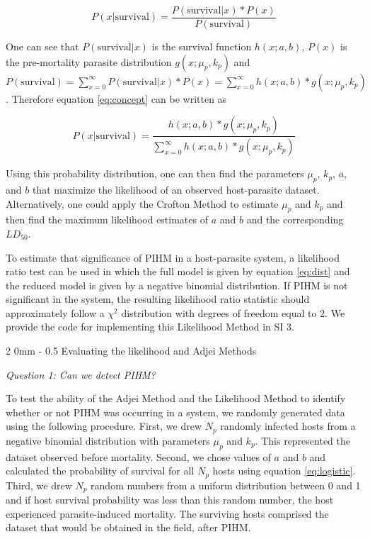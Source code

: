 \documentclass[12pt, a4paper]{article}
\makeatletter
\renewcommand{\subsection}{\@startsection
{subsection}%
{2}%
{0mm}%
{-\baselineskip}%
{0.5\baselineskip}%
{\normalfont\bf}} %
\makeatother
\begin{document}
\begin{equation}
    P(x | \text{survival}) = \dfrac{P(\text{survival} | x) * P(x)}{P(\text{survival})}
    \label{eq:concept}
\end{equation}

One can see that $P(\text{survival} | x)$ is the survival function $h(x; a, b)$, $P(x)$ is the pre-mortality parasite distribution $g(x; \mu_p, k_p)$ and $P(\text{survival}) = \sum_{x=0}^{\infty} P(\text{survival} | x) * P(x) =  \sum_{x=0}^{\infty} h(x; a, b)  * g(x; \mu_p, k_p)$. Therefore equation \ref{eq:concept} can be written as

\begin{equation}
    P(x | \text{survival}) = \dfrac{h(x; a, b)  * g(x; \mu_p, k_p)}{\sum_{x=0}^{\infty} h(x; a, b)  * g(x; \mu_p, k_p)}
    \label{eq:dist}
\end{equation}

Using this probability distribution, one can then find the parameters $\mu_p$, $k_p$, $a$, and $b$ that maximize the likelihood of an observed host-parasite dataset. Alternatively, one could apply the Crofton Method to estimate $\mu_p$ and $k_p$ and then find the maximum likelihood estimates of $a$ and $b$ and the corresponding $LD_{50}$.

To estimate that significance of PIHM in a host-parasite system, a
likelihood ratio test can be used in which the full model is given by equation
\ref{eq:dist} and the reduced model is given by a negative binomial
distribution.  If PIHM is not significant in the system, the resulting likelihood
ratio statistic should approximately follow a $\chi^2$ distribution with degrees of freedom equal to 2.  We provide the code for implementing this Likelihood Method in SI 3.

\subsection{Evaluating the likelihood and Adjei Methods}

\emph{Question 1: Can we detect PIHM?}

To test the ability of the Adjei Method and the Likelihood Method to identify whether or not PIHM was occurring in a system, we randomly generated data using the following procedure.  First, we drew $N_p$ randomly infected hosts from a
negative binomial distribution with parameters $\mu_p$ and $k_p$.  This represented the dataset observed before mortality. Second, we chose values of $a$ and $b$ and calculated the probability of survival
for all $N_p$ hosts using equation \ref{eq:logistic}.  Third, we drew $N_p$ random numbers from a uniform distribution
between 0 and 1 and if host survival probability was less than this random
number, the host experienced parasite-induced mortality.  The surviving
hosts comprised the dataset that would be obtained in the field, after PIHM.
\end{document}
